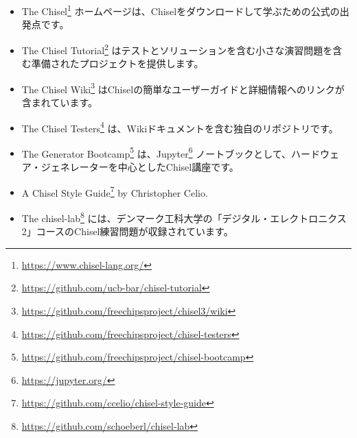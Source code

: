 \documentclass[%
    10pt,
    headinclude, footexclude,
    openright, %
    notitlepage,
    cleardoubleempty,
    headsepline,
    pointlessnumbers,
    bibtotoc, idxtotoc,
    ]{scrbook}
\newcommand{\myref}[2]{\href{#1}{#2}}
\renewcommand{\myref}[2]{{#2}{\footnote{\url{#1}}}}
\newif\ifshowtransfirst
\newif\ifshowtranssecond
\begin{document}
\ifshowtransfirst %
公式Chiselのドキュメントと、さらに文書は、オンラインで利用可能です。
\fi

\ifshowtranssecond %
Chiselの公式ドキュメントやその他の関連ドキュメントはオンラインで利用可能です。
\fi

\begin{itemize}

\item The \myref{https://www.chisel-lang.org/}{Chisel} 
ホームページは、Chiselをダウンロードして学ぶための公式の出発点です。

\item The \myref{https://github.com/ucb-bar/chisel-tutorial}{Chisel Tutorial}
はテストとソリューションを含む小さな演習問題を含む準備されたプロジェクトを提供します。

\item The \myref{https://github.com/freechipsproject/chisel3/wiki}{Chisel Wiki}
はChiselの簡単なユーザーガイドと詳細情報へのリンクが含まれています。

\item The \myref{https://github.com/freechipsproject/chisel-testers}{Chisel Testers} 
は、Wikiドキュメントを含む独自のリポジトリです。

\item The \myref{https://github.com/freechipsproject/chisel-bootcamp}{Generator Bootcamp} 
は、\myref{https://jupyter.org/}{Jupyter} ノートブックとして、ハードウェア・ジェネレーターを中心としたChisel講座です。

\item A \myref{https://github.com/ccelio/chisel-style-guide}{Chisel Style Guide} by Christopher Celio.

\item The \myref{https://github.com/schoeberl/chisel-lab}{chisel-lab}
には、デンマーク工科大学の「デジタル・エレクトロニクス2」コースのChisel練習問題が収録されています。

\end{itemize}
\end{document}
